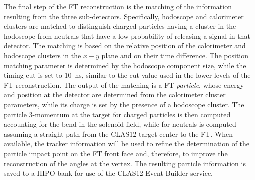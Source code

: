 The final step of the FT reconstruction is the matching of the information resulting from the three sub-detectors.
Specifically, hodoscope and calorimeter clusters are matched to distinguish charged particles having a cluster in the
hodoscope from neutrals that have a low probability of releasing a signal in that detector. The matching is based on
the relative position of the calorimeter and hodoscope clusters in the $x-y$ plane and on their time difference. The
position matching parameter is determined by the hodoscope component size, while the timing cut is set to 10~ns,
similar to the cut value used in the lower levels of the FT reconstruction. The output of the matching is a FT
{\it particle}, whose energy and position at the detector are determined from the calorimeter cluster parameters,
while its charge is set by the presence of a hodoscope cluster. The particle 3-momentum at the target for charged
particles is then computed accounting for the bend in the solenoid field, while for neutrals is computed assuming a
straight path from the CLAS12 target center to the FT. When available, the tracker information will be used to
refine the determination of the particle impact point on the FT front face and, therefore, to improve the
reconstruction of the angles at the vertex. The resulting particle information is saved to a HIPO bank for use of
the CLAS12 Event Builder service.

